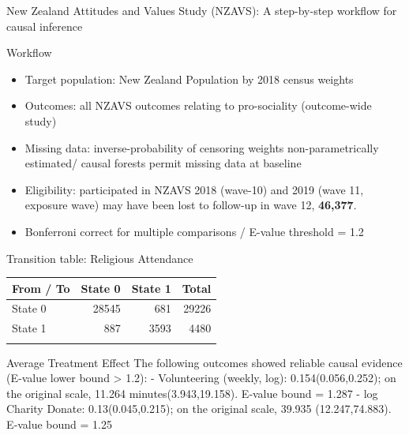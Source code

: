 \documentclass[
  ignorenonframetext,
  aspectratio=169,
]{beamer}
\providecommand{\tightlist}{%
  \setlength{\itemsep}{0pt}\setlength{\parskip}{0pt}}
\begin{document}
\begin{frame}{New Zealand Attitudes and Values Study (NZAVS): A
step-by-step workflow for causal inference}
\begin{block}{Workflow}
\label{workflow}
\begin{itemize}
\tightlist
\item
  Target population: New Zealand Population by 2018 census weights
\item
  Outcomes: all NZAVS outcomes relating to pro-sociality (outcome-wide
  study)
\item
  Missing data: inverse-probability of censoring weights
  non-parametrically estimated/ causal forests permit missing data at
  baseline
\item
  Eligibility: participated in NZAVS 2018 (wave-10) and 2019 (wave 11,
  exposure wave) may have been lost to follow-up in wave 12,
  \textbf{46,377}.
\item
  Bonferroni correct for multiple comparisons / E-value threshold = 1.2
\end{itemize}
\end{block}

\begin{block}{Transition table: Religious Attendance}
\label{transition-table-religious-attendance}
\begin{longtable}[]{@{}lrrr@{}}
\toprule\noalign{}
From / To & State 0 & State 1 & Total \\
\midrule\noalign{}
\endhead
State 0 & 28545 & 681 & 29226 \\
State 1 & 887 & 3593 & 4480 \\
\bottomrule\noalign{}
\end{longtable}
\end{block}

\begin{block}{Average Treatment Effect}
\label{average-treatment-effect}
The following outcomes showed reliable causal evidence (E‑value lower
bound \textgreater{} 1.2): - Volunteering (weekly, log):
0.154(0.056,0.252); on the original scale, 11.264 minutes(3.943,19.158).
E‑value bound = 1.287 - log Charity Donate: 0.13(0.045,0.215); on the
original scale, 39.935 (12.247,74.883). E‑value bound = 1.25
\end{block}
\end{frame}
\end{document}
